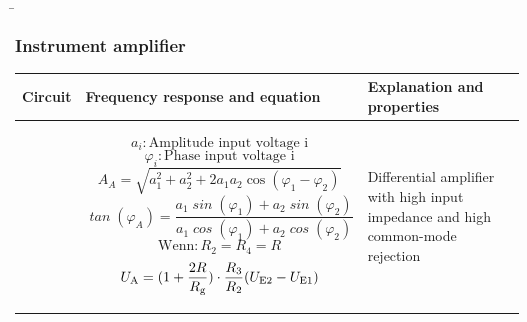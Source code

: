 \begin{frame}
    \b{
        \frametitle{Instrument amplifier}
    \centering
    \begin{table}[ht]
    \label{tab:Instrumentenverstaerker}
    \begin{tabular}{|m{}|m{}|m{}|}
    \hline
    Circuit & Frequency response and equation & Explanation and properties\\ %
    \hline
    \vspace{0.5cm}
    \centering
    
     &
         \begin{center}
   
\end{center}

\vspace{1ex}
\[
\mathit{a_i} : \text{Amplitude input voltage i}
\]
\[
\mathit{\varphi_i} : \text{Phase input voltage i}
\]
\[
\mathit{A}_{A} = \sqrt{a_1^2 + a_2^2 + 2a_1a_2 \cos(\varphi_1 - \varphi_2)}
\]
\[
\mathit{\tan}(\varphi_A) = \frac{a_1 \mathit{\sin}(\varphi_1) + a_2 \mathit{\sin}(\varphi_2)}{a_1 \mathit{\cos}(\varphi_1) + a_2 \mathit{\cos}(\varphi_2)}
\]
\[
    \text{Wenn} : R_2 = R_4 = R
\]
\[
    U_{\textnormal{A}} = (1+ \frac{2R} {R_{\textnormal{g}}}) \cdot \frac{R_3} {R_2} (U_{\textnormal{E2}}-U_{\textnormal{E1}})
\]
     & 
    Differential amplifier with high input impedance and high common-mode rejection  
 \\
    \hline
    \end{tabular}
    \end{table}
    }
\end{frame}

